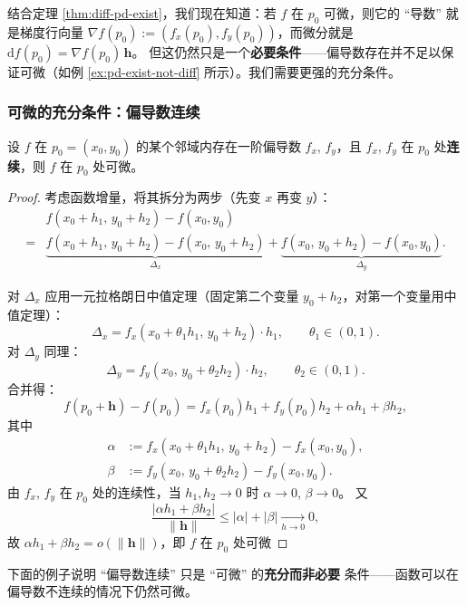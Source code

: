 \documentclass[lang=cn,11pt]{elegantbook}
\begin{document}
\begin{note}
结合定理 \ref{thm:diff-pd-exist}，我们现在知道：若 $f$ 在 $p_0$ 可微，则它的 ``导数'' 就是梯度行向量 $\nabla f(p_0):=(f_x(p_0),f_y(p_0))$，而微分就是 $\mathrm{d}f(p_0)=\nabla f(p_0)\,\boldsymbol h$。
但这仍然只是一个\textbf{必要条件}——偏导数存在并不足以保证可微（如例 \ref{ex:pd-exist-not-diff} 所示）。我们需要更强的充分条件。
\end{note}

\subsubsection*{可微的充分条件：偏导数连续}

\begin{theorem}[可微的充分条件] \label{thm:diff-sufficient}
设 $f$ 在 $p_0=(x_0,y_0)$ 的某个邻域内存在一阶偏导数 $f_x$, $f_y$，且 $f_x$, $f_y$ 在 $p_0$ 处\textbf{连续}，则 $f$ 在 $p_0$ 处可微。
\end{theorem}

\begin{proof}
考虑函数增量，将其拆分为两步（先变 $x$ 再变 $y$）：
\begin{align*}
&f(x_0+h_1,\,y_0+h_2)-f(x_0,y_0)\\
=&\underbrace{f(x_0+h_1,\,y_0+h_2)-f(x_0,\,y_0+h_2)}_{\Delta_x}  +\underbrace{f(x_0,\,y_0+h_2)-f(x_0,y_0)}_{\Delta_y}.
\end{align*}

对 $\Delta_x$ 应用一元拉格朗日中值定理（固定第二个变量 $y_0+h_2$，对第一个变量用中值定理）：
\[
\Delta_x = f_x(x_0+\theta_1 h_1,\,y_0+h_2)\cdot h_1, \qquad\theta_1\in(0,1).
\]
对 $\Delta_y$ 同理：
\[
\Delta_y = f_y(x_0,\,y_0+\theta_2 h_2)\cdot h_2, \qquad\theta_2\in(0,1).
\]
合并得：
\[
f(p_0+\boldsymbol h)-f(p_0) = f_x(p_0)h_1+f_y(p_0)h_2 +\alpha h_1+\beta h_2,
\]
其中
\begin{align*}
\alpha&:=f_x(x_0+\theta_1 h_1,\,y_0+h_2)-f_x(x_0,y_0),\\
\beta&:=f_y(x_0,\,y_0+\theta_2 h_2)-f_y(x_0,y_0).
\end{align*}
由 $f_x$, $f_y$ 在 $p_0$ 处的连续性，当 $h_1,h_2\to 0$ 时 $\alpha\to 0$, $\beta\to 0$。
又
\[
\frac{|\alpha h_1+\beta h_2|}{\|\boldsymbol h\|} \leqslant  |\alpha|+|\beta|\xrightarrow[h\to 0]{}0,
\]
故 $\alpha h_1+\beta h_2=o(\|\boldsymbol h\|)$，即 $f$ 在 $p_0$ 处可微
\end{proof}

\begin{remark}[充分条件非必要]
下面的例子说明 ``偏导数连续'' 只是 ``可微'' 的\textbf{充分而非必要} 条件——函数可以在偏导数不连续的情况下仍然可微。
\end{remark}
\end{document}
